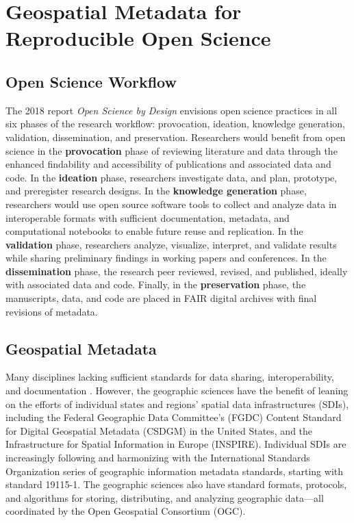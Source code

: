 \documentclass{isprs} %
\begin{document}
\section{Geospatial Metadata for Reproducible Open Science}\label{sec:Background}

\subsection{Open Science Workflow}\label{sec:Workflow}

The 2018 \citeauthor{NASEM2018} report \textit{Open Science by Design} envisions open science practices in all six phases of the research workflow: provocation, ideation, knowledge generation, validation, dissemination, and preservation.
Researchers would benefit from open science in the \textbf{provocation} phase of reviewing literature and data through the enhanced findability and accessibility of publications and associated data and code.
In the \textbf{ideation} phase, researchers investigate data, and plan, prototype, and preregister research designs.
In the \textbf{knowledge generation} phase, researchers would use open source software tools to collect and analyze data in interoperable formats with sufficient documentation, metadata, and computational notebooks to enable future reuse and replication. 
In the \textbf{validation} phase, researchers analyze, visualize, interpret, and validate results while sharing preliminary findings in working papers and conferences.
In the \textbf{dissemination} phase, the research peer reviewed, revised, and published, ideally with associated data and code.
Finally, in the \textbf{preservation} phase, the manuscripts, data, and code are placed in FAIR digital archives with final revisions of metadata.

\subsection{Geospatial Metadata}\label{sec:Metadata}

Many disciplines lacking sufficient standards for data sharing, interoperability, and documentation \citep{NASEM2019}.
However, the geographic sciences have the benefit of leaning on the efforts of individual states and regions' spatial data infrastructures (SDIs), including the Federal Geographic Data Committee's (FGDC) Content Standard for Digital Geospatial Metadata (CSDGM) in the United States, and the Infrastructure for Spatial Information in Europe (INSPIRE).
Individual SDIs are increasingly following and harmonizing with the International Standards Organization \citep{ISO2014} series of geographic information metadata standards, starting with standard 19115-1. 
The geographic sciences also have standard formats, protocols, and algorithms for storing, distributing, and analyzing geographic data---all coordinated by the Open Geospatial Consortium (OGC).
\end{document}
